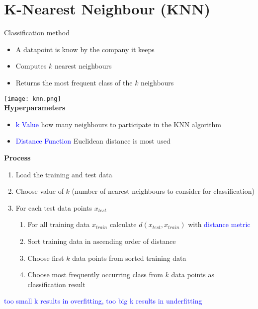 \section{K-Nearest Neighbour (KNN)}
Classification method

\begin{itemize}
    \item A datapoint is know by the company it keeps
    \item Computes $k$ nearest neighbours
    \item Returns the most frequent class of the $k$ neighbours
\end{itemize}
\texttt{[image: knn.png]} \\

\textbf{Hyperparameters}
\begin{itemize}
    \item \textcolor{blue}{k Value} how many neighbours to participate in the KNN algorithm
    \item \textcolor{blue}{Distance Function} Euclidean distance is most used
\end{itemize}
\vspace{10pt}
\textbf{Process}
\begin{enumerate}
    \item Load the training and test data
    \item Choose value of $k$ (number of nearest neighbours to consider for classification)
    \item For each test data points $x_{test}$
    \begin{enumerate}
        \item For all training data $x_{train}$ calculate $d(x_{test}, x_{train})$ with \textcolor{blue}{distance metric}
        \item Sort training data in ascending order of distance
        \item Choose first $k$ data points from sorted training data
        \item Choose most frequently occurring class from $k$ data points as classification result
    \end{enumerate}
\end{enumerate}
\vspace{10pt}
\textcolor{blue}{too small k results in overfitting, too big k results in underfitting} \\


